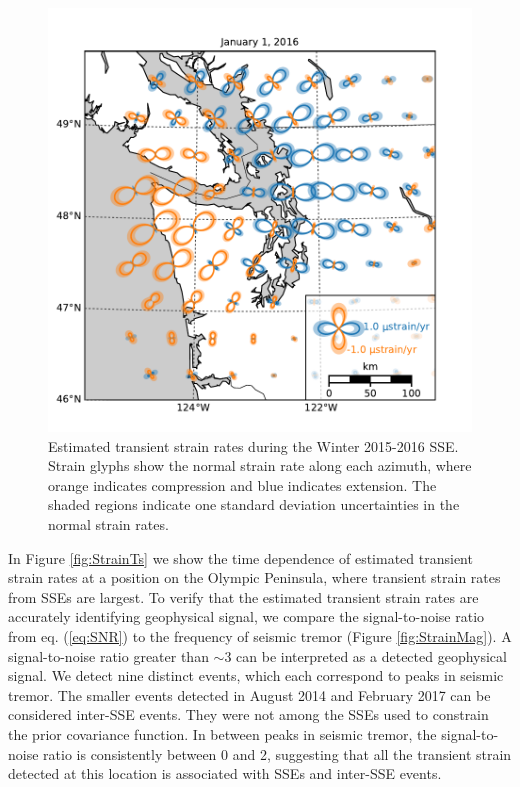 \documentclass[extra,mreferee]{gji}
\begin{document}
\begin{figure}
\includegraphics{figures/strain_map/strain-map.pdf}
\caption{Estimated transient strain rates during the Winter 2015-2016 SSE. Strain glyphs show the normal strain rate along each azimuth, where orange indicates compression and blue indicates extension. The shaded regions indicate one standard deviation uncertainties in the normal strain rates.}   
\label{fig:StrainMap}
\end{figure}

In Figure \ref{fig:StrainTs} we show the time dependence of estimated transient strain rates at a position on the Olympic Peninsula, where transient strain rates from SSEs are largest. To verify that the estimated transient strain rates are accurately identifying geophysical signal, we compare the signal-to-noise ratio from eq. (\ref{eq:SNR}) to the frequency of seismic tremor (Figure \ref{fig:StrainMag}). A signal-to-noise ratio greater than ${\sim}3$ can be interpreted as a detected geophysical signal. We detect nine distinct events, which each correspond to peaks in seismic tremor. The smaller events detected in August 2014 and February 2017 can be considered inter-SSE events. They were not among the SSEs used to constrain the prior covariance function. In between peaks in seismic tremor, the signal-to-noise ratio is consistently between 0 and 2, suggesting that all the transient strain detected at this location is associated with SSEs and inter-SSE events.
\end{document}
